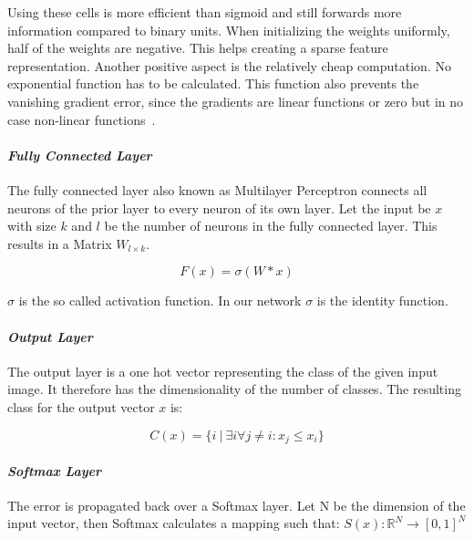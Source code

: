 \documentclass[10pt,journal,compsoc, hidelinks]{IEEEtran}
\newcommand{\paraV}{\vspace{1em}}
\begin{document}
Using these cells is more efficient than sigmoid and still forwards more information compared to binary units. When initializing the weights uniformly, half of the weights are negative. This helps creating a sparse feature representation. Another positive aspect is the relatively cheap computation. No exponential function has to be calculated. This function also prevents the vanishing gradient error, since the gradients are linear functions or zero but in no case non-linear functions~\cite{AISTATS2011_GlorotBB11}.


\paraV
\paragraph{\textit{Fully Connected Layer}}

The fully connected layer also known as Multilayer Perceptron connects all neurons of the prior layer to every neuron of its own layer. Let the input be $x$ with size $k$ and $l$ be the number of neurons in the fully connected layer. This results in a Matrix $W_{l \times k}$.

\begin{center}
\begin{minipage}{0.4\columnwidth}
\begin{equation}
F(x) = \sigma(W*x)
\end{equation}
\end{minipage}
\end{center}

$\sigma$ is the so called activation function. In our network $\sigma$ is the identity function. 

\paraV
\paragraph{\textit{Output Layer}}
The output layer is a one hot vector representing the class of the given input image. It therefore has the dimensionality of the number of classes. The resulting class for the output vector $x$ is:

\begin{center}
\begin{minipage}{0.65\columnwidth}
\begin{equation}
C(x) = \{i\ |\ \exists i \forall j \neq i : x_j \leq x_i\}
\end{equation}
\end{minipage}
\end{center}

\paraV
\paragraph{\textit{Softmax Layer}}
The error is propagated back over a Softmax layer. Let N be the dimension of the input vector, then Softmax calculates a mapping such that:
$S(x): \mathbb{R}^N \rightarrow [0,1]^N$
\end{document}
